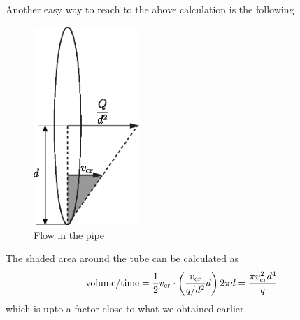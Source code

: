 Another easy way to reach to the above calculation is the following 
%
\begin{figure}[h]
  \centering
  \includegraphics[width=4cm]{./Figs/model1.eps}
  \caption{Flow in the pipe}
\end{figure}
%
The shaded area around the tube can be calculated as 
%
\begin{align}
    \text{volume}/\text{time} = \frac{1}{2} v_\text{cr} \cdot \left( \frac{v_\text{cr}}{q/d^2} d \right) 2 \pi d = \frac{\pi v_\text{cr}^2 d^4}{q}
\end{align}
%
which is upto a factor close to what we obtained earlier. 

